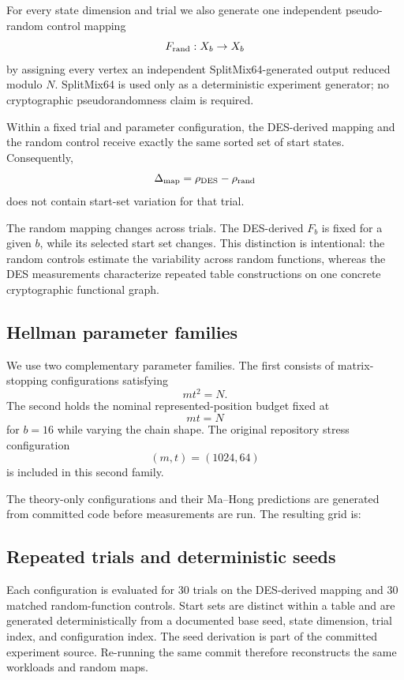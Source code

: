 For every state dimension and trial we also generate one independent
pseudo-random control mapping
\[
  F_{\rm rand}:X_b\to X_b
\]
by assigning every vertex an independent SplitMix64-generated output reduced
modulo $N$.  SplitMix64 is used only as a deterministic experiment generator;
no cryptographic pseudorandomness claim is required.

Within a fixed trial and parameter configuration, the DES-derived mapping and
the random control receive exactly the same sorted set of start states.
Consequently,
\[
  \Delta_{\rm map}
    =
    \rho_{\rm DES}-\rho_{\rm rand}
\]
does not contain start-set variation for that trial.

The random mapping changes across trials.  The DES-derived $F_b$ is fixed for a
given $b$, while its selected start set changes.  This distinction is
intentional: the random controls estimate the variability across random
functions, whereas the DES measurements characterize repeated table
constructions on one concrete cryptographic functional graph.

\subsection{Hellman parameter families}

We use two complementary parameter families.  The first consists of
matrix-stopping configurations satisfying
\[
    mt^2=N.
\]
The second holds the nominal represented-position budget fixed at
\[
    mt=N
\]
for $b=16$ while varying the chain shape.  The original repository stress
configuration
\[
    (m,t)=(1024,64)
\]
is included in this second family.

The theory-only configurations and their Ma--Hong predictions are generated
from committed code before measurements are run.  The resulting grid is:

\begin{table}[ht]
\centering
\small

\caption{Hellman parameter configurations.  The last column is the
Ma--Hong random-function prediction for the fraction of the whole state space
covered by the first $t$ columns.}
\label{tab:theory-grid}
\end{table}

\subsection{Repeated trials and deterministic seeds}

Each configuration is evaluated for 30 trials on the DES-derived mapping and
30 matched random-function controls.  Start sets are distinct within a table
and are generated deterministically from a documented base seed, state
dimension, trial index, and configuration index.  The seed derivation is part
of the committed experiment source.  Re-running the same commit therefore
reconstructs the same workloads and random maps.

